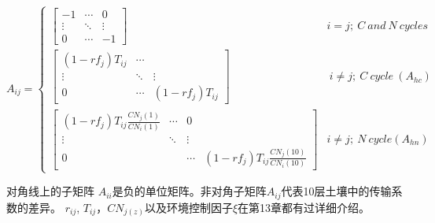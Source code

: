 \begin{equation}
A_{i j}=\left\{\begin{array}{ccc}{\left[\begin{array}{ccc}-1 & \cdots & 0 \\ \vdots & \ddots & \vdots \\ 0 & \cdots & -1\end{array}\right]}   &i=j;\ C\ and\ N\ cycles \\
 {\left[\begin{array}{ccc}\left(1-r f_{j}\right) T_{i j} & \cdots & \\ \vdots & \ddots & \vdots \\ 0 & \cdots & \left(1-r f_{j}\right) T_{i j}\end{array}\right]}   &\ i\neq j;\ C\ cycle\ \left(A_{hc}\right)\  \\ 
 {\left[\begin{array}{cccc}\left(1-r f_{j}\right) T_{i j} \frac{C N_{j}(1)}{C N_{i}(1)} & \cdots & 0 \\ \vdots & \ddots & \vdots \\ 0 & & \cdots & \left(1-r f_{j}\right) T_{i j} \frac{C N_{j}(10)}{C N_{i}(10)}\end{array}\right]}& i\neq j;\ N\ cycle\left(A_{hn}\right) \end{array}\right.
\end{equation}


对角线上的子矩阵 $A_{ii}$是负的单位矩阵。非对角子矩阵$A_{ij}$代表10层土壤中的传输系数的差异。
$r_{ij}$, $T_{ij}$，$CN_{j(z)}$以及环境控制因子$\xi$在第13章都有过详细介绍。

